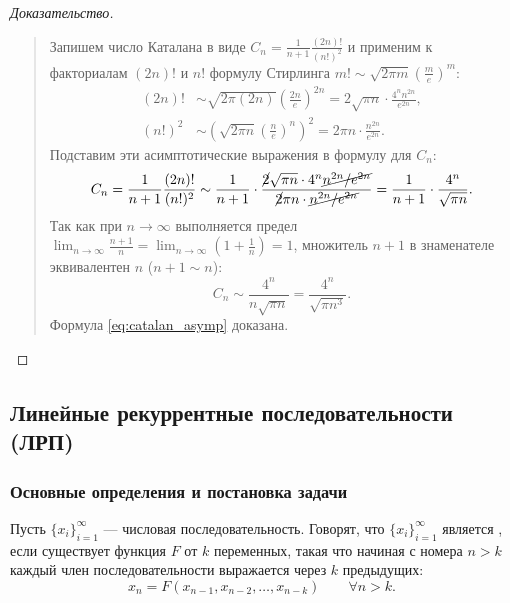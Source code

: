 \begin{proof}[Доказательство]~\\
    \begin{quote}
        Запишем число Каталана в виде $C_n = \frac{1}{n + 1} \frac{(2n)!}{(n!)^2}$ 
        и применим к факториалам $(2n)!$ и $n!$ формулу Стирлинга 
        $m! \sim \sqrt{2 \pi m} \left(\frac{m}{e}\right)^m$:
        \begin{align*}
            (2n)! &\sim \sqrt{2 \pi (2n)} \left(\frac{2n}{e}\right)^{2n} = 
            2\sqrt{\pi n} \cdot \frac{4^n n^{2n}}{e^{2n}}, \\
            (n!)^2 &\sim \left(\sqrt{2 \pi n} \left(\frac{n}{e}\right)^n\right)^2 = 
            2 \pi n \cdot \frac{n^{2n}}{e^{2n}}.
        \end{align*}
        Подставим эти асимптотические выражения в формулу для $C_n$:
        \[
            C_n = \frac{1}{n + 1} \frac{(2n)!}{(n!)^2} \sim 
            \frac{1}{n + 1} \cdot 
            \frac{\cancel{2}\sqrt{\pi n} \cdot 4^n \cancel{n^{2n} / e^{2n}}}
            {\cancel{2} \pi n \cdot \cancel{n^{2n} / e^{2n}}} = 
            \frac{1}{n + 1} \cdot \frac{4^n}{\sqrt{\pi n}}.
        \]
        Так как при $n \to \infty$ выполняется предел $\lim_{n \to \infty} 
        \frac{n + 1}{n} = \lim_{n \to \infty} \left(1 + \frac{1}{n}\right) = 1$, 
        множитель $n + 1$ в знаменателе эквивалентен $n$ ($n + 1 \sim n$):
        \[
            C_n \sim \frac{4^n}{n \sqrt{\pi n}} = \frac{4^n}{\sqrt{\pi n^3}}.
        \]
        Формула \eqref{eq:catalan_asymp} доказана.
    \end{quote}
\end{proof}

\subsection{Линейные рекуррентные последовательности (ЛРП)}

\subsubsection{Основные определения и постановка задачи}

\begin{definition}
    Пусть $\{x_i\}_{i=1}^\infty$ --- числовая последовательность. Говорят, 
    что $\{x_i\}_{i=1}^\infty$ является , если существует функция $F$ от $k$ 
    переменных, такая что начиная с номера $n > k$ каждый член 
    последовательности выражается через $k$ предыдущих:
    \begin{equation} \label{eq:rec_seq_def}
        x_n = F(x_{n-1}, x_{n-2}, \dots, x_{n-k}) \qquad \forall n > k. \tag{9}
    \end{equation}
\end{definition}

